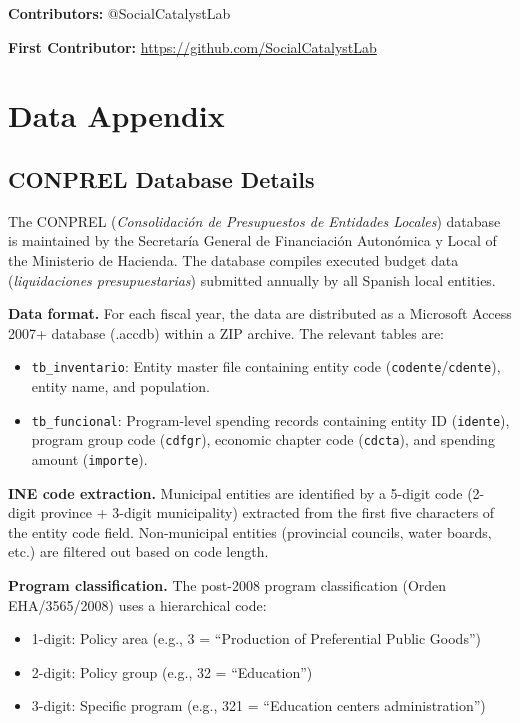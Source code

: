 \documentclass[12pt]{article}
\begin{document}
\noindent\textbf{Contributors:} @SocialCatalystLab

\noindent\textbf{First Contributor:} \url{https://github.com/SocialCatalystLab}

\label{apep_main_text_end}
\newpage


\newpage
\appendix

\section{Data Appendix}

\subsection{CONPREL Database Details}

The CONPREL (\emph{Consolidaci\'{o}n de Presupuestos de Entidades Locales}) database is maintained by the Secretar\'{i}a General de Financiaci\'{o}n Auton\'{o}mica y Local of the Ministerio de Hacienda. The database compiles executed budget data (\emph{liquidaciones presupuestarias}) submitted annually by all Spanish local entities.

\textbf{Data format.} For each fiscal year, the data are distributed as a Microsoft Access 2007+ database (.accdb) within a ZIP archive. The relevant tables are:

\begin{itemize}
    \item \texttt{tb\_inventario}: Entity master file containing entity code (\texttt{codente}/\texttt{cdente}), entity name, and population.
    \item \texttt{tb\_funcional}: Program-level spending records containing entity ID (\texttt{idente}), program group code (\texttt{cdfgr}), economic chapter code (\texttt{cdcta}), and spending amount (\texttt{importe}).
\end{itemize}

\textbf{INE code extraction.} Municipal entities are identified by a 5-digit code (2-digit province + 3-digit municipality) extracted from the first five characters of the entity code field. Non-municipal entities (provincial councils, water boards, etc.) are filtered out based on code length.

\textbf{Program classification.} The post-2008 program classification (Orden EHA/3565/2008) uses a hierarchical code:
\begin{itemize}
    \item 1-digit: Policy area (e.g., 3 = ``Production of Preferential Public Goods'')
    \item 2-digit: Policy group (e.g., 32 = ``Education'')
    \item 3-digit: Specific program (e.g., 321 = ``Education centers administration'')
\end{itemize}
\end{document}
